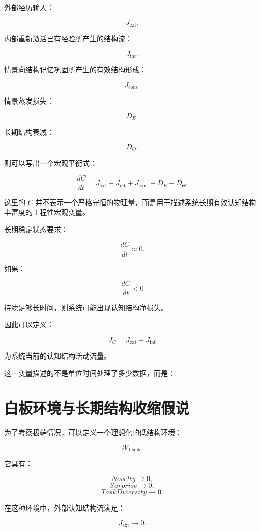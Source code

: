 外部经历输入：

\[
J_{\mathrm{ext}}.
\]

内部重新激活已有经验所产生的结构流：

\[
J_{\mathrm{int}}.
\]

情景向结构记忆巩固所产生的有效结构形成：

\[
J_{\mathrm{cons}}.
\]

情景蒸发损失：

\[
D_E.
\]

长期结构衰减：

\[
D_\Theta.
\]

则可以写出一个宏观平衡式：

\[
\boxed{
\frac{dC}{dt}
=
J_{\mathrm{ext}}
+
J_{\mathrm{int}}
+
J_{\mathrm{cons}}
-
D_E
-
D_\Theta.
}
\]

这里的 $C$ 并不表示一个严格守恒的物理量，而是用于描述系统长期有效认知结构丰富度的工程性宏观变量。

长期稳定状态要求：

\[
\frac{dC}{dt}
\approx 0.
\]

如果：

\[
\frac{dC}{dt}<0
\]

持续足够长时间，则系统可能出现认知结构净损失。

因此可以定义：

\[
\boxed{
J_C
=
J_{\mathrm{ext}}
+
J_{\mathrm{int}}
}
\]

为系统当前的认知结构活动流量。

这一变量描述的不是单位时间处理了多少数据，而是：

\begin{statementbox}
\centering
{}
\end{statementbox}

\section{白板环境与长期结构收缩假说}

为了考察极端情况，可以定义一个理想化的低结构环境：

\[
\mathcal W_{\mathrm{blank}}.
\]

它具有：

\[
Novelty\rightarrow0,
\]
\[
Surprise\rightarrow0,
\]
\[
TaskDiversity\rightarrow0.
\]

在这种环境中，外部认知结构流满足：

\[
J_{\mathrm{ext}}\rightarrow0.
\]

